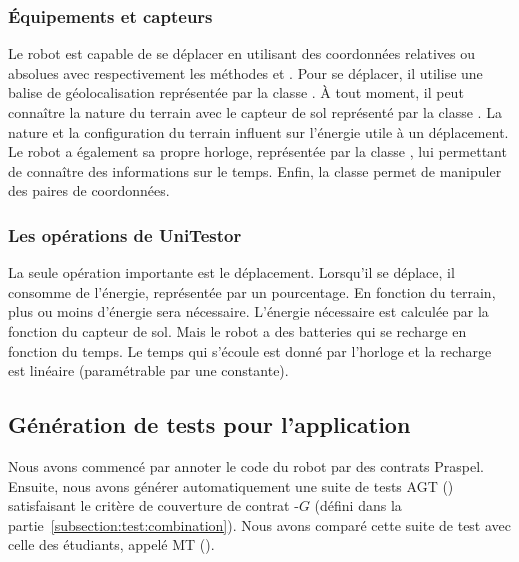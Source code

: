 \subsubsection{Équipements et capteurs}

Le robot est capable de se déplacer en utilisant des coordonnées relatives ou
absolues avec respectivement les méthodes  et . Pour se
déplacer, il utilise une balise de géolocalisation représentée par la classe
. À tout moment, il peut connaître la nature du terrain avec
le capteur de sol représenté par la classe . La nature et la
configuration du terrain influent sur l'énergie utile à un déplacement. Le robot
a également sa propre horloge, représentée par la classe , lui
permettant de connaître des informations sur le temps. Enfin, la classe
 permet de manipuler des paires de coordonnées.

\subsubsection{Les opérations de UniTestor}

La seule opération importante est le déplacement. Lorsqu'il se déplace, il
consomme de l'énergie, représentée par un pourcentage. En fonction du terrain,
plus ou moins d'énergie sera nécessaire. L'énergie nécessaire est calculée par
la fonction  du capteur de sol. Mais le robot a des
batteries qui se recharge en fonction du temps. Le temps qui s'écoule est donné
par l'horloge et la recharge est linéaire (paramétrable par une constante).

\subsection{Génération de tests pour l'application}

Nous avons commencé par annoter le code du robot par des contrats Praspel.
Ensuite, nous avons générer automatiquement une suite de tests AGT
() satisfaisant le critère de
couverture de contrat -$G$ (défini dans la
partie~\ref{subsection:test:combination}).  Nous avons comparé cette suite de
test avec celle des étudiants, appelé MT ().


